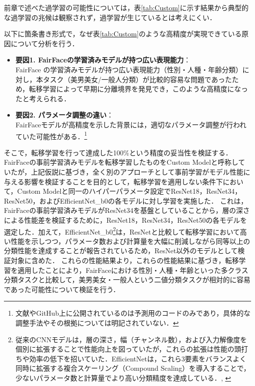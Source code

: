 \documentclass[a4paper,11pt,titlepage]{jsarticle}
\begin{document}
前章で述べた過学習の可能性については，表\ref{tab:Custom}に示す結果から典型的な過学習の兆候は観察されず，過学習が生じているとは考えにくい．\par

以下に箇条書き形式で，なぜ表\ref{tab:Custom}のような高精度が実現できている原因について分析を行う．

\begin{itemize}
  \item \textbf{要因1. FairFaceの学習済みモデルが持つ広い表現能力}：  \\
  FairFace の学習済みモデルが持つ広い表現能力（性別・人種・年齢分類）に対し，本タスク（美男美女/一般人分類）が比較的容易な問題であったため，転移学習によって早期に分離境界を発見でき，このような高精度になったと考えられる．

  \item \textbf{要因2. パラメータ調整の違い}：  \\
  FairFaceモデルが高精度を示した背景には，適切なパラメータ調整が行われていた可能性がある．\footnote{文献\cite{karkkainenFairFace}やGitHub上に公開されているのは予測用のコードのみであり，具体的な調整手法やその根拠については明記されていない．}
\end{itemize}

そこで，転移学習を行って達成した100\%という精度の妥当性を検証する．
FairFaceの事前学習済みモデルを転移学習したものをCustom Modelと呼称していたが，上記仮説に基づき，全く別のアプローチとして事前学習がモデル性能に与える影響を検証することを目的として，転移学習を適用しない条件下において，Custom Modelと同一のハイパーパラメータ設定でResNet18，ResNet34，ResNet50，およびEfficientNet\_b0の各モデルに対し学習を実施した．
これは，FairFaceの事前学習済みモデルがResNet34を基盤としていることから，層の深さによる性能差を検証するために，ResNet18，ResNet34，ResNet50の各モデルを選定した．加えて，EfficientNet\_b0\footnote{従来のCNNモデルは，層の深さ，幅（チャンネル数），および入力解像度を個別に拡張することで性能向上を図っていたが，これらの拡張は性能の頭打ちや効率の低下を招いていた．EfficientNetは，これら3要素をバランスよく同時に拡張する複合スケーリング（Compound Scaling）を導入することで，少ないパラメータ数と計算量でより高い分類精度を達成している．\cite{efficientnet}, \cite{efficientnet_git} }は，ResNetと比較して転移学習において高い性能を示しつつ，パラメータ数および計算量を大幅に削減しながら同等以上の分類性能を達成することが報告されているため，ResNet以外のモデルとして検証対象に含めた．
これらの性能結果より，これらの性能結果に基づき，転移学習を適用したことにより，FairFaceにおける性別・人種・年齢といった多クラス分類タスクと比較して，美男美女・一般人という二値分類タスクが相対的に容易であった可能性について検証を行う．
\end{document}
